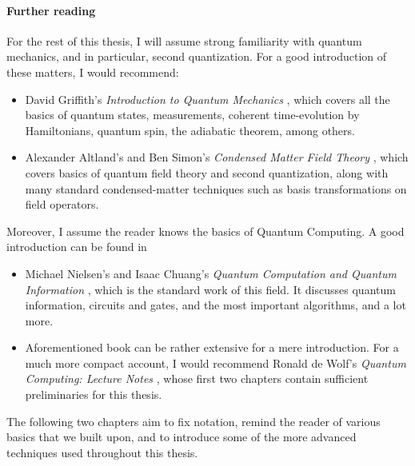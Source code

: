 %
%
%





%


%

%









\paragraph{Further reading}
For the rest of this thesis, I will assume strong familiarity with quantum mechanics, and in particular, second quantization. For a good introduction of these matters, I would recommend:
\begin{itemize}
\item David Griffith's \emph{Introduction to Quantum Mechanics} \cite{Griffiths2005}, which covers all the basics of quantum states, measurements, coherent time-evolution by Hamiltonians, quantum spin, the adiabatic theorem, among others.
\item Alexander Altland's and Ben Simon's \emph{Condensed Matter Field Theory} \cite{Altland2010}, which covers basics of quantum field theory and second quantization, along with many standard condensed-matter techniques such as basis transformations on field operators. 
\end{itemize}
%
Moreover, I assume the reader knows the basics of Quantum Computing. A good introduction can be found in 
\begin{itemize}
\item Michael Nielsen's and Isaac Chuang's \emph{Quantum Computation and Quantum Information} \cite{Nielsen2010}, which is the standard work of this field. It discusses quantum information, circuits and gates, and the most important algorithms, and a lot more.
\item Aforementioned book can be rather extensive for a mere introduction. For a much more compact account, I would recommend Ronald de Wolf's \emph{Quantum Computing: Lecture Notes} \cite{deWolf2019}, whose first two chapters contain sufficient preliminaries for this thesis. 
\end{itemize}
The following two chapters aim to fix notation, remind the reader of various basics that we built upon, and to introduce some of the more advanced techniques used throughout this thesis. 











